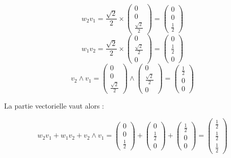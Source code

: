 \documentclass[a4paper,12pt]{article}
\begin{document}
\begin{enumerate}
            \[ w_2 v_1 = \frac{\sqrt{2}}{2} \times \begin{pmatrix} 0 \\ 0 \\ \frac{\sqrt{2}}{2} \end{pmatrix}
            = \begin{pmatrix} 0 \\ 0 \\ \frac{1}{2} \end{pmatrix} \]
            \[ w_1 v_2 = \frac{\sqrt{2}}{2} \times \begin{pmatrix} 0 \\ \frac{\sqrt{2}}{2} \\ 0 \end{pmatrix}
            = \begin{pmatrix} 0 \\ \frac{1}{2} \\ 0 \end{pmatrix} \]
            \[ v_2 \wedge v_1 
            = \begin{pmatrix} 0 \\ 0 \\ \frac{\sqrt{2}}{2} \end{pmatrix}
            \wedge \begin{pmatrix} 0 \\ \frac{\sqrt{2}}{2} \\ 0 \end{pmatrix} 
            = \begin{pmatrix} \frac{1}{2} \\ 0 \\ 0 \end{pmatrix}
            \]

            La partie vectorielle vaut alors :

            \[ w_2 v_1 + w_1 v_2 + v_2 \wedge v_1 = 
              \begin{pmatrix} 0 \\ 0 \\ \frac{1}{2} \end{pmatrix} + 
              \begin{pmatrix} 0 \\ \frac{1}{2} \\ 0 \end{pmatrix} + 
              \begin{pmatrix} \frac{1}{2} \\ 0 \\ 0 \end{pmatrix} = 
              \begin{pmatrix} \frac{1}{2} \\ \frac{1}{2} \\ \frac{1}{2} \end{pmatrix}
            \]


\end{enumerate}
\end{document}

